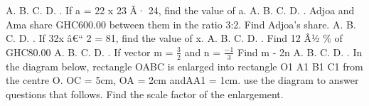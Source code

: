 \documentclass{article}
\begin{document}
\begin{multicols}{2}
\indent A. \newline \indent B. \newline \indent C. \newline \indent D.  \newline{}. If a = 22 x 23 Ã· 24, find the value of a. \newline \indent A. \newline \indent B. \newline \indent C. \newline \indent D.  \newline{}. Adjoa and Ama share GHC600.00 between them in the ratio 3:2. Find Adjoa's share. \newline \indent A. \newline \indent B. \newline \indent C. \newline \indent D.  \newline{}. If 32x â€“ 2 = 81, find the value of x. \newline \indent A. \newline \indent B. \newline \indent C. \newline \indent D.  \newline{}. Find 12 Â½ \% of GHC80.00 \newline \indent A. \newline \indent B. \newline \indent C. \newline \indent D.  \newline{}. If vector m = \(\frac{3}{2}\) and n = \(\frac{-1}{3}\)
Find m - 2n \newline \indent A. \newline \indent B. \newline \indent C. \newline \indent D.  \newline{}.  In the diagram below, rectangle OABC is enlarged into rectangle O1 A1 B1 C1 from the centre O. OC = 5cm, OA = 2cm andAA1 = 1cm. use the diagram to answer questions that follows.
 Find the scale factor of the enlargement.\newline
  

\end{multicols}
\end{document}
